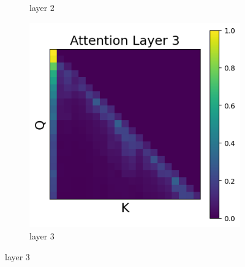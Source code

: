 \documentclass[11pt]{article}
\begin{document}
\begin{figure}[t]
\begin{subfigure}[t]{0.24\textwidth}
    \caption{layer 2}
  \end{subfigure}\hfill
  \begin{subfigure}[t]{0.24\textwidth}
    \centering
    \includegraphics[width=1.4\columnwidth]{figures/intervention4/layer_3.png}
    \caption{layer 3}
  \end{subfigure}\hfill


\end{figure}
\end{document}
